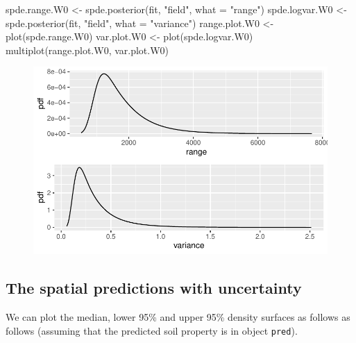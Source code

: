 \documentclass[
  a4paper,
]{article}
\newenvironment{Shaded}{\begin{snugshade}}{\end{snugshade}}
\newcommand{\AttributeTok}[1]{\textcolor[rgb]{0.40,0.45,0.13}{#1}}
\newcommand{\FunctionTok}[1]{\textcolor[rgb]{0.28,0.35,0.67}{#1}}
\newcommand{\NormalTok}[1]{\textcolor[rgb]{0.00,0.23,0.31}{#1}}
\newcommand{\OtherTok}[1]{\textcolor[rgb]{0.00,0.23,0.31}{#1}}
\newcommand{\StringTok}[1]{\textcolor[rgb]{0.13,0.47,0.30}{#1}}
\begin{document}
\begin{Shaded}
\begin{Highlighting}[]
\NormalTok{spde.range.W0 }\OtherTok{\textless{}{-}} \FunctionTok{spde.posterior}\NormalTok{(fit, }\StringTok{"field"}\NormalTok{, }\AttributeTok{what =} \StringTok{"range"}\NormalTok{)}
\NormalTok{spde.logvar.W0 }\OtherTok{\textless{}{-}} \FunctionTok{spde.posterior}\NormalTok{(fit, }\StringTok{"field"}\NormalTok{, }\AttributeTok{what =} \StringTok{"variance"}\NormalTok{)}
\NormalTok{range.plot.W0 }\OtherTok{\textless{}{-}} \FunctionTok{plot}\NormalTok{(spde.range.W0)}
\NormalTok{var.plot.W0 }\OtherTok{\textless{}{-}} \FunctionTok{plot}\NormalTok{(spde.logvar.W0)}
\FunctionTok{multiplot}\NormalTok{(range.plot.W0, var.plot.W0)}
\end{Highlighting}
\end{Shaded}

\begin{figure}[H]

{\centering \includegraphics{pedometron_files/figure-pdf/unnamed-chunk-12-1.pdf}

}

\end{figure}

\hypertarget{the-spatial-predictions-with-uncertainty}{%
\subsection{The spatial predictions with
uncertainty}\label{the-spatial-predictions-with-uncertainty}}

We can plot the median, lower 95\% and upper 95\% density surfaces as
follows as follows (assuming that the predicted soil property is in
object \texttt{pred}).
\end{document}
